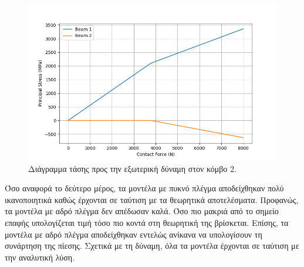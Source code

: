\documentclass{article}
\begin{document}
\begin{figure}[H]
    \centering
    \includegraphics[width=0.8\linewidth]{media/sF.png}
    \caption{Διάγραμμα τάσης προς την εξωτερική δύναμη στον κόμβο 2.}
    \label{fig:a3}
\end{figure}


Όσο αναφορά το δεύτερο μέρος, τα μοντέλα με πυκνό πλέγμα αποδείχθηκαν πολύ ικανοποιητικά καθώς έρχονται σε ταύτιση με τα θεωρητικά αποτελέσματα. Προφανώς, τα μοντέλα με αδρό πλέγμα δεν απέδωσαν καλά. Όσο πιο μακριά από το σημείο επαφής υπολογίζεται τιμή τόσο πιο κοντά στη θεωρητική της βρίσκεται. Επίσης, τα μοντέλα με αδρό πλέγμα αποδείχθηκαν εντελώς ανίκανα να υπολογίσουν τη συνάρτηση της πίεσης. Σχετικά με τη δύναμη, όλα τα μοντέλα έρχονται σε ταύτιση με την αναλυτική λύση.
\end{document}
